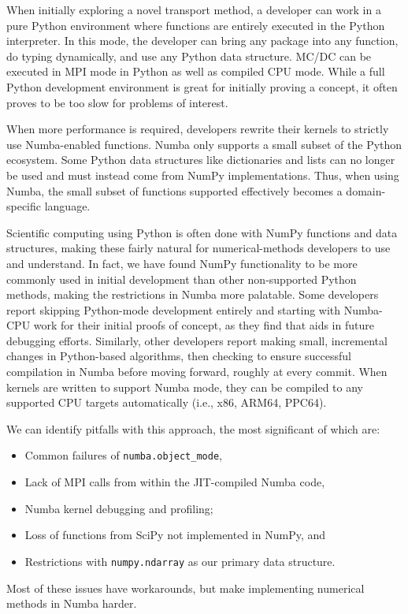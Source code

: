 When initially exploring a novel transport method, a developer can work in a pure Python environment where functions are entirely executed in the Python interpreter.
In this mode, the developer can bring any package into any function, do typing dynamically, and use any Python data structure.
MC/DC can be executed in MPI mode in Python as well as compiled CPU mode.
While a full Python development environment is great for initially proving a concept, it often proves to be too slow for problems of interest.

When more performance is required, developers rewrite their kernels to strictly use Numba-enabled functions.
Numba only supports a small subset of the Python ecosystem. 
Some Python data structures like dictionaries and lists can no longer be used and must instead come from NumPy implementations. 
Thus, when using Numba, the small subset of functions supported effectively becomes a domain-specific language.

Scientific computing using Python is often done with NumPy functions and data structures, making these fairly natural for numerical-methods developers to use and understand.
In fact, we have found NumPy functionality to be more commonly used in initial development than other non-supported Python methods, making the restrictions in Numba more palatable.
Some developers report skipping Python-mode development entirely and starting with Numba-CPU work for their initial proofs of concept, as they find that aids in future debugging efforts.
Similarly, other developers report making small, incremental changes in Python-based algorithms, then checking to ensure successful compilation in Numba before moving forward, roughly at every commit.
When kernels are written to support Numba mode, they can be compiled to any supported CPU targets automatically (i.e., x86, ARM64, PPC64).

We can identify pitfalls with this approach, the most significant of which are:
\begin{itemize}
    \item Common failures of \texttt{numba.object\_mode},
    \item Lack of MPI calls from within the JIT-compiled Numba code,
    \item Numba kernel debugging and profiling;
    \item Loss of functions from SciPy not implemented in NumPy, and
    \item Restrictions with \texttt{numpy.ndarray} as our primary data structure.
\end{itemize}
Most of these issues have workarounds, but make implementing numerical methods in Numba harder.

